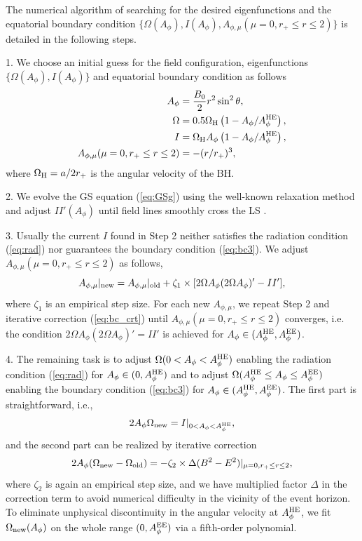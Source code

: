 \documentclass[aps,prd,reprint,nofootinbib, superscriptaddress]{revtex4-1}
\def\sst{\sin^2\theta}
\def\Ap{A_\phi}
\def\Am{A_{\phi,\mu}}
\def\be{\begin{equation}}
\def\ee{\end{equation}}
\def\WH{\Omega_{\rm H}}
\def\AHE{A_\phi^{\rm HE}}
\def\AEE{A_\phi^{\rm EE}}
\begin{document}
The numerical algorithm of searching for the desired eigenfunctions and the equatorial
boundary condition $\{\Omega(A_\phi), I(A_\phi), \Am(\mu =0, r_+\leq r \leq 2)\}$
is detailed in the following steps.

1. We choose an initial guess for the field configuration, eigenfunctions
$\{ \Omega(\Ap), I(\Ap)\}$
and equatorial boundary condition  as follows
\begin{subequations}
\begin{align}
    \Ap &= \frac{B_0}{2}r^2 \sst,  \label{eq:gss1} \\
    \Omega & = 0.5\WH\left(1-\Ap/\AHE\right),  \label{eq:gss2}\\
    I & = \WH \Ap\left(1-\Ap/\AHE\right) , \\
    \Am(\mu =0, r_+\leq r \leq 2) & = - (r/r_+)^3, \label{eq:gss3}
\end{align}
\end{subequations}
where $\WH = a/2r_+$ is the angular velocity of the BH.

2. We evolve the GS equation (\ref{eq:GSg}) using the well-known relaxation method \cite{Press1987}
 and adjust $II'(\Ap)$ until  field lines smoothly cross the LS
\cite[see e.g.][for more details]{Contopoulos2013, Nathanail2014, Pan2017, Mahlmann2018}.

3. Usually the current $I$ found in Step 2 neither satisfies the radiation condition (\ref{eq:rad})
nor guarantees the boundary condition (\ref{eq:bc3}). We  adjust
$\Am(\mu = 0, r_+ \leq r\leq 2)$ as follows,
\be
\label{eq:bc_crt}
 A_{\phi,\mu}|_{\rm new}  = A_{\phi,\mu}|_{\rm old} + \zeta_1\times[2\Omega\Ap(2\Omega\Ap)' -II'],
\ee
where $\zeta_1$ is an empirical step size. For each new $A_{\phi,\mu}$, we repeat Step 2 and iterative
correction (\ref{eq:bc_crt}) until $\Am(\mu = 0, r_+ \leq r\leq 2)$ converges, i.e. the condition $2\Omega\Ap(2\Omega\Ap)' = II'$ is
achieved for $A_\phi\in (A_\phi^{\rm HE}, A_\phi^{\rm EE})$.

4. The remaining task is to adjust  $\Omega(0< \Ap < \AHE)$ enabling  the radiation condition (\ref{eq:rad})
 for $A_\phi \in (0, A_\phi^{\rm HE})$ and  to adjust $\Omega(\AHE \leq \Ap \leq \AEE)$
 enabling the boundary condition (\ref{eq:bc3}) for $\Ap \in (\AHE, \AEE)$.
 The first part is straightforward, i.e.,
 \be
2\Ap\Omega_{\rm new}  = I|_{0 < \Ap < \AHE},
 \ee
 and the second part can be realized by iterative correction
 \be
2\Ap(\Omega_{\rm new} - \Omega_{\rm old}) =  - \zeta_2\times\Delta (B^2-E^2)|_{\mu=0, r_+\leq r \leq 2},
 \ee
 where $\zeta_2$ is again an empirical step size, and we have multiplied factor $\Delta$
 in the correction term to avoid numerical difficulty in the vicinity of the event horizon.
 To eliminate unphysical discontinuity in the angular
 velocity at $\AHE$, we fit $\Omega_{\rm new}(\Ap)$ on the whole range
 $(0, \AEE)$ via a fifth-order polynomial.
\end{document}
